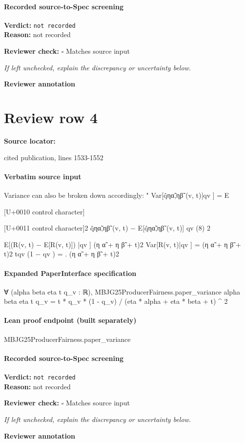 \documentclass[10pt]{article}
\newcommand{\reviewerbox}{%
  \par\noindent\fbox{\parbox{0.96\linewidth}{\rule{0pt}{0.38in}}}\par
}
\newcommand{\reviewmatch}[1]{%
  \par\noindent\textbf{Reviewer check:} $\square$\; #1\par
  \noindent\emph{If left unchecked, explain the discrepancy or uncertainty below.}\par
}
\begin{document}
\paragraph{Recorded source-to-Spec screening}
\textbf{Verdict:} \texttt{not recorded}
\\
\textbf{Reason:} not recorded
\reviewmatch{Matches source input}
\noindent\textbf{Reviewer annotation}\par
\reviewerbox
\clearpage
\hypertarget{source-claim-23bc13a84ad0b29a}{}
\section*{Review row 4}
\textbf{Source locator:} {\footnotesize\raggedright cited publication, lines 1533-\allowbreak{}1552\par}
\paragraph{Verbatim source input}
\begin{ReviewVerbatim}
Variance can also be broken down accordingly:
"
Var[q̂ηα̃,ηβ̃ (v, t)|qv ] = E

[U+0010 control character]

[U+0011 control character]2
q̂ηα̃,ηβ̃ (v, t) − E[q̂ηα̃,ηβ̃ (v, t)] qv
(8)
2

E[(R(v, t) − E[R(v, t)]) |qv ]
(η α̃ + η β̃ + t)2
Var[R(v, t)|qv ]
=
(η α̃ + η β̃ + t)2
tqv (1 − qv )
=
.
(η α̃ + η β̃ + t)2
\end{ReviewVerbatim}


\paragraph{Expanded PaperInterface specification}
\begin{ReviewVerbatim}
∀ (alpha beta eta t q_v : ℝ),
  MBJG25ProducerFairness.paper_variance alpha beta eta t q_v = t * q_v * (1 - q_v) / (eta * alpha + eta * beta + t) ^ 2
\end{ReviewVerbatim}

\paragraph{Lean proof endpoint (built separately)}\begin{ReviewVerbatim}
MBJG25ProducerFairness.paper_variance
\end{ReviewVerbatim}

\paragraph{Recorded source-to-Spec screening}
\textbf{Verdict:} \texttt{not recorded}
\\
\textbf{Reason:} not recorded
\reviewmatch{Matches source input}
\noindent\textbf{Reviewer annotation}\par
\reviewerbox
\clearpage
\hypertarget{source-claim-6e52f3be6106ad49}{}
\end{document}
